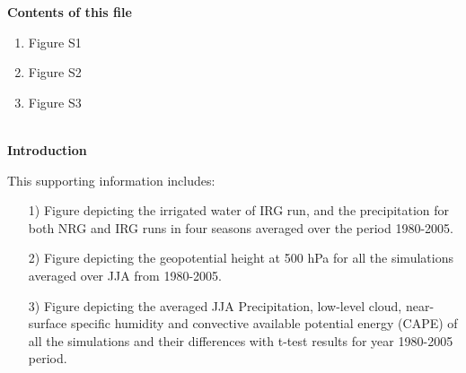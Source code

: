 \documentclass[draft,ms]{agutexSI}
\begin{document}
\begin{article}

%
%



\noindent\textbf{Contents of this file}
\begin{enumerate}
\item Figure S1
\item Figure S2
\item Figure S3
\end{enumerate}
\ \\

\noindent\textbf{Introduction}


This supporting information includes:

\begin{itemize}

\item[1)] Figure depicting the irrigated water of IRG run, and the precipitation for both NRG and IRG runs in four seasons averaged over the period 1980-2005. 

\item[2)] Figure depicting the geopotential height at 500 hPa for all the simulations averaged over JJA from 1980-2005.

\item[3)] Figure depicting the averaged JJA Precipitation, low-level cloud, near-surface specific humidity and convective available potential energy (CAPE) of all the simulations and their differences with t-test results for year 1980-2005 period.

\end{itemize}


%
%


%

%
%
\end{article}
\clearpage
\end{document}
